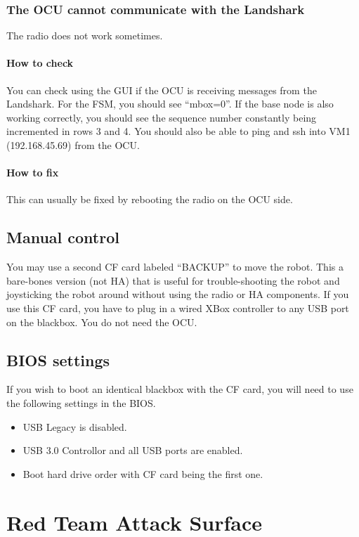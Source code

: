 \subsection{The OCU cannot communicate with the Landshark}
The radio does not work sometimes. 

\subsubsection{How to check}
You can check using the GUI if the OCU is receiving messages from the Landshark. For the FSM,
you should see ``mbox=0''. If the base node is also working correctly, you should see the sequence
number constantly being incremented in rows 3 and 4. You should also be able to ping and ssh
into VM1 (192.168.45.69) from the OCU.

\subsubsection{How to fix}
This can usually be fixed by rebooting the radio on the OCU side.

\section{Manual control}
You may use a second CF card labeled ``BACKUP'' to move the robot. This a bare-bones version (not
HA) that is useful for trouble-shooting the robot and joysticking the robot around without using
the radio or HA components. If you use this CF card, you have to plug in a wired XBox controller to any USB port on the blackbox. You do not need the OCU.

\section{BIOS settings}
If you wish to boot an identical blackbox with the CF card, you will need to use the following
settings in the BIOS.

\begin{itemize}
  \item USB Legacy is disabled.
  \item USB 3.0 Controllor and all USB ports are enabled.
  \item Boot hard drive order with CF card being the first one.
\end{itemize}


\chapter{Red Team Attack Surface}
\label{sec:attack}


